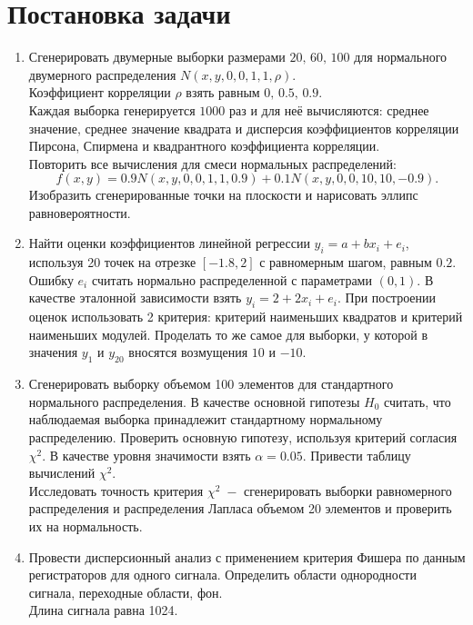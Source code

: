 \documentclass[a4paper]{article}
\begin{document}

\tableofcontents
{}
\newpage
\listoffigures
{}
\newpage
\listoftables
{}
\newpage
\section{Постановка задачи}
\begin{enumerate}
    \item Сгенерировать двумерные выборки размерами $20,\,60,\,100$ для нормального двумерного распределения $N(x,y,0,0,1,1,\rho)$.\\
    Коэффициент корреляции $\rho$ взять равным $0,\,0.5,\,0.9$.\\
    Каждая выборка генерируется $1000$ раз и для неё вычисляются: среднее значение, среднее значение квадрата и дисперсия коэффициентов корреляции Пирсона, Спирмена и квадрантного коэффициента корреляции.\\
    Повторить все вычисления для смеси нормальных распределений:
    \begin{equation*}
        f(x,y)=0.9N(x,y,0,0,1,1,0.9)+0.1N(x,y,0,0,10,10,-0.9).
    \end{equation*}
    Изобразить сгенерированные точки на плоскости и нарисовать эллипс
    равновероятности.
    \item Найти оценки коэффициентов линейной регрессии $y_i=a+b x_i + e_i$, используя 20 точек на отрезке $[-1.8,2]$ с равномерным шагом, равным $0.2$. Ошибку $e_i$ считать нормально распределенной с параметрами $(0,1)$. В качестве эталонной зависимости взять $y_i=2+2x_i+e_i$. При построении оценок использовать 2 критерия: критерий наименьших квадратов и критерий наименьших модулей. Проделать то же самое для выборки, у которой в значения $y_1$ и $y_{20}$ вносятся возмущения $10$ и $-10$.
    \item Сгенерировать выборку объемом 100 элементов для стандартного нормального распределения. В качестве основной гипотезы $H_0$ считать, что наблюдаемая выборка принадлежит стандартному нормальному распределению. Проверить основную гипотезу, используя критерий согласия $\chi^2$. В качестве уровня значимости взять $\alpha=0.05$. Привести таблицу вычислений $\chi^2$.\\
    Исследовать точность критерия $\chi^2\;-$ сгенерировать выборки равномерного распределения и распределения Лапласа объемом 20 элементов и проверить их на нормальность.
    \item Провести дисперсионный анализ с применением критерия Фишера по данным регистраторов для одного сигнала. Определить области однородности сигнала, переходные области, фон.\\Длина сигнала равна 1024.
\end{enumerate}
\end{document}
